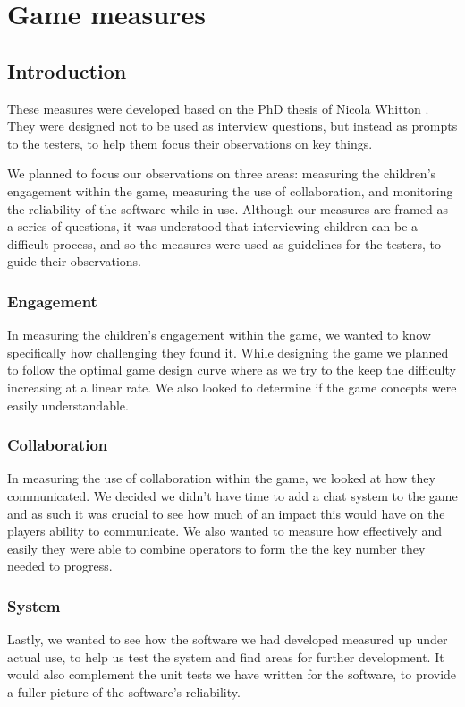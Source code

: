 \chapter{Game measures}
\label{apdx:measures}

\section{Introduction}
These measures were developed based on the PhD thesis of Nicola Whitton \cite{whitton07}.
They were designed not to be used as interview questions, but instead as prompts to
the testers, to help them focus their observations on key things.

We planned to focus our observations on three areas: measuring the children’s engagement
within the game, measuring the use of collaboration, and monitoring the reliability
of the software while in use. Although our measures are framed as a series of questions,
it was understood that interviewing children can be a difficult process, and
so the measures were used as guidelines for the testers, to guide their observations.

\subsection{Engagement}
In measuring the children’s engagement within the game, we wanted to know specifically
how challenging they found it. While designing the game we planned to follow the optimal
game design curve where  as we try to the keep the difficulty increasing at a linear rate.
We also looked to determine if the game concepts were easily understandable.

\subsection{Collaboration}
In measuring the use of collaboration within the game, we looked at how they communicated.
We decided we didn’t have time to add a chat system to the game and as such it was crucial to
see how much of an impact this would have on the players ability to communicate.
We also wanted to measure how effectively and easily they were able to combine operators to
form the the key number they needed to progress.

\subsection{System}
Lastly, we wanted to see how the software we had developed measured up under actual use,
to help us test the system and find areas for further development. It would also complement
the unit tests we have written for the software, to provide a fuller picture of the
software's reliability.

